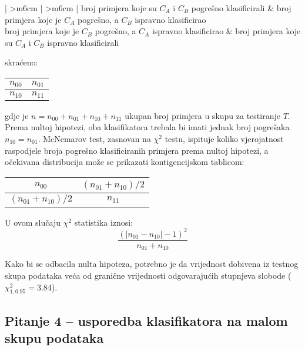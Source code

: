 \begin{table}[h]
\centering
\begin{tabular}{{| >{\centering\arraybackslash}m{6cm} | >{\centering\arraybackslash}m{6cm} |}}
\hline
broj primjera koje su $C_A$ i $C_B$ pogrešno klasificirali & broj primjera koje je $C_A$ pogrešno, a $C_B$ ispravno klasificirao \\ \hline
broj primjera koje je $C_B$ pogrešno, a $C_A$ ispravno klasificirao & broj primjera koje su $C_A$ i $C_B$ ispravno klasificirali \\
\hline
\end{tabular}
\end{table}
skraćeno:
\begin{table}[h]
\centering
\begin{tabular}{|c|c|}
\hline
$n_{00}$ & $n_{01}$ \\ \hline
$n_{10}$ & $n_{11}$ \\
\hline
\end{tabular}
\end{table}
gdje je $n = n_{00}+n_{01}+n_{10}+n_{11}$ ukupan broj primjera u skupu za testiranje $T$. Prema nultoj hipotezi, oba klasifikatora trebala bi imati jednak broj pogrešaka $n_{10}=n_{01}$. McNemarov test, zasnovan na $\chi^2$ testu, ispituje koliko vjerojatnost raspodjele broja pogrešno klasificiranih primjera prema nultoj hipotezi, a očekivana distribucija može se prikazati kontigencijskom tablicom:
\begin{table}[h]
\centering
\begin{tabular}{|c|c|}
\hline
$n_{00}$ & $(n_{01} + n_{10})/2$ \\ \hline
$(n_{01} + n_{10})/2$ & $n_{11}$ \\
\hline
\end{tabular}
\end{table}

U ovom slučaju $\chi^2$ statistika iznosi:
\begin{equation}
\frac{(|n_{01} - n_{10}|-1)^2}{n_{01}+n_{10}}
\end{equation}

Kako bi se odbacila nulta hipoteza, potrebno je da vrijednost dobivena iz testnog skupa podataka veća od granične vrijednosti odgovarajućih stupnjeva slobode ($\chi^{2}_{1,0.95} = 3.84$).

\subsection{Pitanje 4 -- usporedba klasifikatora na malom skupu podataka}

